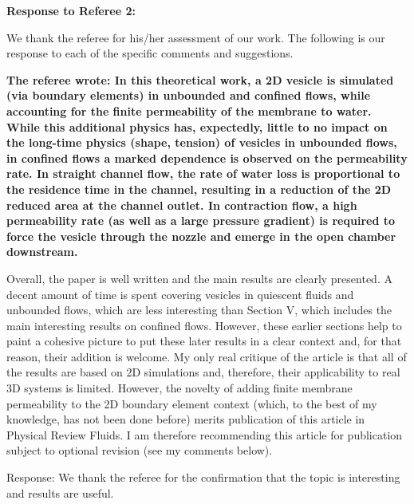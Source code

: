 \documentclass[12pt]{article}
\begin{document}
\newpage
\vspace{0.5cm}
{\large \bf Response to Referee 2:}
\vspace{0.5cm}

We thank the referee for his/her assessment of our work.  
The following is
our response to each of the specific comments and suggestions.

{\bf The referee wrote:
In this theoretical work, a 2D vesicle is simulated (via boundary elements) in unbounded and confined flows, while accounting for the finite permeability of the membrane to water. While this additional physics has, expectedly, little to no impact on the long-time physics (shape, tension) of vesicles in unbounded flows, in confined flows a marked dependence is observed on the permeability rate. In straight channel flow, the rate of water loss is proportional to the residence time in the channel, resulting in a reduction of the 2D reduced area at the channel outlet. In contraction flow, a high permeability rate (as well as a large pressure gradient) is required to force the vesicle through the nozzle and emerge in the open chamber downstream.

Overall, the paper is well written and the main results are clearly presented. A decent amount of time is spent covering vesicles in quiescent fluids and unbounded flows, which are less interesting than Section V, which includes the main interesting results on confined flows. However, these earlier sections help to paint a cohesive picture to put these later results in a clear context and, for that reason, their addition is welcome. My only real critique of the article is that all of the results are based on 2D simulations and, therefore, their applicability to real 3D systems is limited. However, the novelty of adding finite membrane permeability to the 2D boundary element context (which, to the best of my knowledge, has not been done before) merits publication of this article in Physical Review Fluids. I am therefore recommending this article for publication subject to optional revision (see my comments below).}


\noindent
Response: We thank the referee for the confirmation that the topic is interesting and results are useful.
\end{document}
